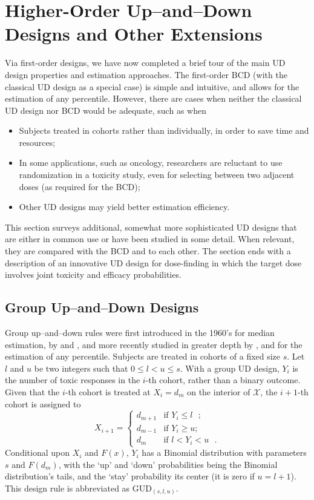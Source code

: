 \section{Higher-Order Up--and--Down Designs and Other Extensions}\label{sec:extens}

Via first-order designs, we have now completed a brief tour of the main UD design properties and estimation approaches. The first-order BCD (with the classical UD design as a special case) is simple and intuitive, and allows for the estimation of any percentile. However, there are cases when neither the classical UD design nor BCD would be adequate, such as when
%
\begin{itemize}
\item Subjects treated in cohorts rather than individually, in order to save time and resources;
\item In some applications, such as oncology, researchers are reluctant to use randomization in a toxicity study, even for selecting between two adjacent doses (as required for the BCD);
\item Other UD designs may yield better estimation efficiency.
\end{itemize}
%
This section surveys additional, somewhat more sophisticated UD designs that are either in common use or have been studied in some detail. When relevant, they are compared with the BCD and to each other. The section ends with a description of an innovative UD design for dose-finding in which the target dose involves joint toxicity and efficacy probabilities.

\subsection{Group Up--and--Down Designs}\label{sec:gud}

Group up--and--down rules were first introduced in the 1960's for median estimation, by \cite{Weth:Sequ:1963} and \cite{Tsut:asym:1967,Tsut:rand:1967}, and more recently studied in greater depth by \cite{Gezm:Flou:Grou:2006}, \cite{Ivan:esca:2006} and \cite{Bald:Bort:Giov:2008} for the estimation of any percentile. Subjects are treated in cohorts of a fixed size $s$. Let $l$ and $u$ be two integers such that $0\le l< u\le s$. With a group UD design, $Y_i$ is the number of toxic responses in the $i$-th cohort, rather than a binary outcome. Given that the $i$-th cohort is treated at $X_i=d_m$ on the interior of $\mathcal{X}$, the $i+1$-th cohort is assigned to
%
\begin{equation*}
X_{i+1}=
\begin{cases}
d_{m+1} &\textrm{if $Y_i\le l$ };\\
d_{m-1} &\textrm{if $Y_i\ge u$};\\
d_m &\textrm{if $l<Y_i<u$ }.
\end{cases}
\end{equation*}
%
Conditional upon $X_i$ and $F(x)$, $Y_i$ has a Binomial distribution with parameters $s$ and $F(d_m)$, with the `up' and `down' probabilities being the Binomial distribution's tails, and the `stay' probability its center (it is zero if $u=l+1$). This design rule is abbreviated as GUD$_{(s,l,u)}$.

